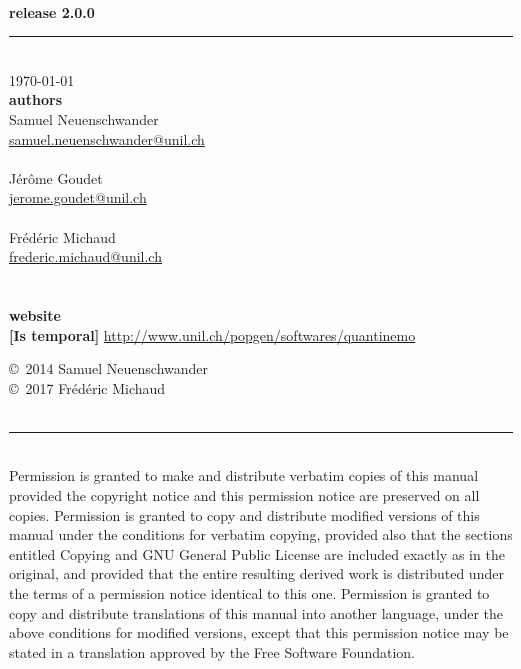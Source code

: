 \documentclass[letterpaper,12pt,oneside]{book}
\newcommand{\tbc}[1]{\small {\bf \color{red} [Is temporal]} \normalsize} %
\begin{document}
\begin{titlepage}
\begin{flushright}
\bfseries{}\\
\Large release 2.0.0
\end{flushright}
\noindent\rule{\linewidth}{1.5pt}

\\[40pt]
\today\\[20pt]
\textbf{authors}\\
Samuel Neuenschwander\\
\href{mailto:samuel.neuenschwander@unil.ch}{samuel.neuenschwander@unil.ch}\\
\\
J\'er\^ome Goudet\\
\href{mailto:jerome.goudet@unil.ch}{jerome.goudet@unil.ch}\\
\\
Fr\'ed\'eric Michaud \\
\href{mailto:frederic.michaud@unil.ch}{frederic.michaud@unil.ch}\\
\\
\\
\textbf{website}\\
\tbc{}\url{http://www.unil.ch/popgen/softwares/quantinemo}\\

\end{titlepage}

\copyright~2014 Samuel Neuenschwander\\
\copyright~2017 Fr\'ed\'eric Michaud \\\\
\noindent\rule{\linewidth}{1pt}\\
{\small Permission is granted to make and distribute verbatim copies of this manual provided the copyright notice and this permission notice are preserved on all copies. Permission is granted to copy and distribute modified versions of this manual under the conditions for verbatim copying, provided also that the sections entitled Copying and GNU General Public License are included exactly as in the original, and provided that the entire resulting derived work is distributed under the terms of a permission notice identical to this one. Permission is granted to copy and distribute translations of this manual into another language, under the above conditions for modified versions, except that this permission notice may be stated in a translation approved by the Free Software Foundation.}
\end{document}

